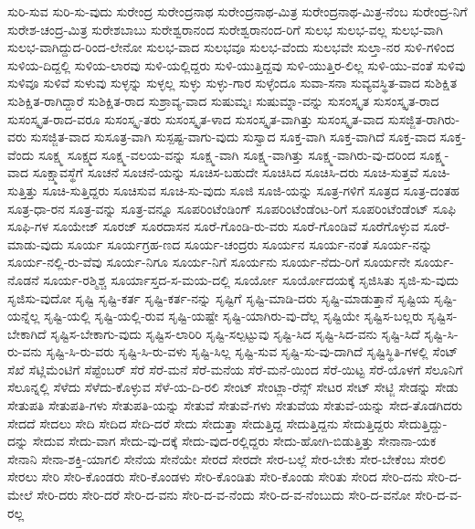 {ಸುರಿ-ಸುವ
ಸುರಿ-ಸು-ವುದು
ಸುರೇಂದ್ರ
ಸುರೇಂದ್ರನಾಥ
ಸುರೇಂದ್ರನಾಥ-ಮಿತ್ರ
ಸುರೇಂದ್ರನಾಥ-ಮಿತ್ರ-ನೆಂಬ
ಸುರೇಂದ್ರ-ನಿಗೆ
ಸುರೇಶ-ಚಂದ್ರ-ಮಿತ್ರ
ಸುರೇಶಬಾಬು
ಸುರೇಶ್ವರಾನಂದ
ಸುರೇಶ್ವರಾನಂದ-ರಿಗೆ
ಸುಲಭ
ಸುಲಭ-ವಲ್ಲ
ಸುಲಭ-ವಾಗಿ
ಸುಲಭ-ವಾಗಿದ್ದುದ-ರಿಂದ-ಲೇನೋ
ಸುಲಭ-ವಾದ
ಸುಲಭವೂ
ಸುಲಭ-ವೆಂದು
ಸುಲಭವೇ
ಸುಲ್ತಾ-ನರ
ಸುಳಿ-ಗಳಿಂದ
ಸುಳಿಯ-ದಿದ್ದಲ್ಲಿ
ಸುಳಿಯ-ಲಾರವು
ಸುಳಿ-ಯಲ್ಲಿದ್ದರು
ಸುಳಿ-ಯುತ್ತಿದ್ದವು
ಸುಳಿ-ಯುತ್ತಿರ-ಲಿಲ್ಲ
ಸುಳಿ-ಯು-ವಂತೆ
ಸುಳಿವು
ಸುಳಿವೂ
ಸುಳಿವೆ
ಸುಳುವು
ಸುಳ್ಳನ್ನು
ಸುಳ್ಳಲ್ಲ
ಸುಳ್ಳು
ಸುಳ್ಳು-ಗಾರ
ಸುಳ್ಳೆಂದೂ
ಸುವಾ-ಸನಾ
ಸುವ್ಯವಸ್ಥಿತ-ವಾದ
ಸುಶಿಕ್ಷಿತ
ಸುಶಿಕ್ಷಿತ-ರಾಗಿದ್ದಾರೆ
ಸುಶಿಕ್ಷಿತ-ರಾದ
ಸುಶ್ರಾವ್ಯ-ವಾದ
ಸುಷುಮ್ನಃ
ಸುಷುಮ್ನಾ-ವನ್ನು
ಸುಸಂಸ್ಕೃತ
ಸುಸಂಸ್ಕೃತ-ರಾದ
ಸುಸಂಸ್ಕೃತ-ರಾದ-ವರೂ
ಸುಸಂಸ್ಕೃ-ತರು
ಸುಸಂಸ್ಕೃತ-ಳಾದ
ಸುಸಂಸ್ಕೃತ-ವಾಗಿತ್ತು
ಸುಸಂಸ್ಕೃತ-ವಾದ
ಸುಸಜ್ಜಿತ-ರಾಗಿರು-ವರು
ಸುಸಜ್ಜಿತ-ವಾದ
ಸುಸೂತ್ರ-ವಾಗಿ
ಸುಸ್ಪಷ್ಟ-ವಾಗು-ವುದು
ಸುಸ್ವಾದ
ಸೂಕ್ತ-ವಾಗಿ
ಸೂಕ್ತ-ವಾಗಿದೆ
ಸೂಕ್ತ-ವಾದ
ಸೂಕ್ತ-ವೆಂದು
ಸೂಕ್ಷ್ಮ
ಸೂಕ್ಷ್ಮದ
ಸೂಕ್ಷ್ಮ-ವಲಯ-ವನ್ನು
ಸೂಕ್ಷ್ಮ-ವಾಗಿ
ಸೂಕ್ಷ್ಮ-ವಾಗಿತ್ತು
ಸೂಕ್ಷ್ಮ-ವಾಗಿರು-ವು-ದರಿಂದ
ಸೂಕ್ಷ್ಮ-ವಾದ
ಸೂಕ್ಷ್ಮಾವಸ್ಥೆಗೆ
ಸೂಚನೆ
ಸೂಚನೆ-ಯನ್ನು
ಸೂಚಿಸ-ಬಹುದೇ
ಸೂಚಿಸಿದ
ಸೂಚಿಸಿ-ದರು
ಸೂಚಿ-ಸುತ್ತವೆ
ಸೂಚಿ-ಸುತ್ತಿತ್ತು
ಸೂಚಿ-ಸುತ್ತಿದ್ದರು
ಸೂಚಿಸುವ
ಸೂಚಿ-ಸು-ವುದು
ಸೂಜಿ
ಸೂಜಿ-ಯನ್ನು
ಸೂತ್ರ-ಗಳಿಗೆ
ಸೂತ್ರದ
ಸೂತ್ರ-ದಂತಹ
ಸೂತ್ರ-ಧಾ-ರನ
ಸೂತ್ರ-ವನ್ನು
ಸೂತ್ರ-ವನ್ನೂ
ಸೂಪರಿಂಟೆಂಡಿಂಗ್
ಸೂಪರಿಂಟೆಂಡೆಂಟ-ರಿಗೆ
ಸೂಪರಿಂಟೆಂಡೆಂಟ್
ಸೂಫಿ
ಸೂಫಿ-ಗಳ
ಸೂಯೇಜ್
ಸೂರಜ್
ಸೂರದಾಸನ
ಸೂರೆ-ಗೊಂಡಿ-ರು-ವರು
ಸೂರೆ-ಗೊಂಡಿವೆ
ಸೂರೆಗೊಳ್ಳುವ
ಸೂರೆ-ಮಾಡು-ವುದು
ಸೂರ್ಯ
ಸೂರ್ಯಗ್ರಹ-ಣದ
ಸೂರ್ಯ-ಚಂದ್ರರು
ಸೂರ್ಯನ
ಸೂರ್ಯ-ನಂತೆ
ಸೂರ್ಯ-ನನ್ನು
ಸೂರ್ಯ-ನಲ್ಲಿ-ರು-ವೆವು
ಸೂರ್ಯ-ನಿಗೂ
ಸೂರ್ಯ-ನಿಗೆ
ಸೂರ್ಯನು
ಸೂರ್ಯ-ನೆದು-ರಿಗೆ
ಸೂರ್ಯನೇ
ಸೂರ್ಯ-ನೊಡನೆ
ಸೂರ್ಯ-ರಶ್ಮಿಶ್ಚ
ಸೂರ್ಯಾಸ್ತದ-ಸ-ಮಯ-ದಲ್ಲಿ
ಸೂರ್ಯೋ
ಸೂರ್ಯೋದಯಕ್ಕೆ
ಸೃಜಿಸಿತು
ಸೃಜಿ-ಸು-ವುದು
ಸೃಜಿಸು-ವುದೋ
ಸೃಷ್ಟಿ
ಸೃಷ್ಟಿ-ಕರ್ತ
ಸೃಷ್ಟಿ-ಕರ್ತ-ನನ್ನು
ಸೃಷ್ಟಿಗೆ
ಸೃಷ್ಟಿ-ಮಾಡಿ-ದರು
ಸೃಷ್ಟಿ-ಮಾಡುತ್ತಾನೆ
ಸೃಷ್ಟಿಯ
ಸೃಷ್ಟಿ-ಯನ್ನೆಲ್ಲ
ಸೃಷ್ಟಿ-ಯಲ್ಲಿ
ಸೃಷ್ಟಿ-ಯಲ್ಲಿ-ರುವ
ಸೃಷ್ಟಿ-ಯಷ್ಟೇ
ಸೃಷ್ಟಿ-ಯಾಗಿರು-ವು-ದೆಲ್ಲ
ಸೃಷ್ಟಿಯೇ
ಸೃಷ್ಟಿಸ-ಬಲ್ಲರು
ಸೃಷ್ಟಿಸ-ಬೇಕಾಗಿದೆ
ಸೃಷ್ಟಿಸ-ಬೇಕಾಗು-ವುದು
ಸೃಷ್ಟಿಸ-ಲಾರಿರಿ
ಸೃಷ್ಟಿ-ಸಲ್ಪಟ್ಟುವು
ಸೃಷ್ಟಿ-ಸಿದ
ಸೃಷ್ಟಿ-ಸಿದ-ವನು
ಸೃಷ್ಟಿ-ಸಿದೆ
ಸೃಷ್ಟಿ-ಸಿ-ರು-ವನು
ಸೃಷ್ಟಿ-ಸಿ-ರು-ವರು
ಸೃಷ್ಟಿ-ಸಿ-ರು-ವಳು
ಸೃಷ್ಟಿ-ಸಿಲ್ಲ
ಸೃಷ್ಟಿ-ಸುವ
ಸೃಷ್ಟಿ-ಸು-ವು-ದಾಗಿದೆ
ಸೃಷ್ಟಿಸ್ಥಿತಿ-ಗಳಲ್ಲಿ
ಸೆಂಟ್
ಸೆಖೆ
ಸೆಟ್ಲಿಮೆಂಟಿಗೆ
ಸೆಪ್ಟೆಂಬರ್
ಸೆರೆ
ಸೆರೆ-ಮನೆ
ಸೆರೆ-ಮನೆಯ
ಸೆರೆ-ಮನೆ-ಯಿಂದ
ಸೆರೆ-ಯಿಟ್ಟ
ಸೆರೆ-ಯೊಳಗೆ
ಸೆಲೂನಿಗೆ
ಸೆಲೂನ್ನಲ್ಲಿ
ಸೆಳೆದು
ಸೆಳೆದು-ಕೊಳ್ಳುವ
ಸೆಳೆ-ಯ-ದಿ-ರಲಿ
ಸೇಂಟ್
ಸೇಂಟ್ಲಾ-ರೆನ್ಸ್
ಸೇಟರ
ಸೇಟ್
ಸೇಟ್ಜಿ
ಸೇಡನ್ನು
ಸೇಡು
ಸೇತುಪತಿ
ಸೇತುಪತಿ-ಗಳು
ಸೇತುಪತಿ-ಯನ್ನು
ಸೇತುವೆ
ಸೇತುವೆ-ಗಳು
ಸೇತುವೆಯ
ಸೇತುವೆ-ಯನ್ನು
ಸೇದ-ತೊಡಗಿದರು
ಸೇದದೆ
ಸೇದಲು
ಸೇದಿ
ಸೇದಿದ
ಸೇದಿ-ದರೆ
ಸೇದು
ಸೇದುತ್ತಾ
ಸೇದುತ್ತಿದ್ದ
ಸೇದುತ್ತಿದ್ದನು
ಸೇದುತ್ತಿದ್ದರು
ಸೇದುತ್ತಿದ್ದು-ದನ್ನು
ಸೇದುವ
ಸೇದು-ವಾಗ
ಸೇದು-ವು-ದಕ್ಕೆ
ಸೇದು-ವುದ-ರಲ್ಲಿದ್ದರು
ಸೇದು-ಹೋಗಿ-ಬಿಡುತ್ತಿತ್ತು
ಸೇನಾನಾ-ಯಕ
ಸೇನಾನಿ
ಸೇನಾ-ಶಕ್ತಿ-ಯಾಗಲಿ
ಸೇನೆಯ
ಸೇನೆಯೇ
ಸೇರದೆ
ಸೇರದೇ
ಸೇರ-ಬಲ್ಲೆ
ಸೇರ-ಬೇಕು
ಸೇರ-ಬೇಕೆಂಬ
ಸೇರಲಿ
ಸೇರಲು
ಸೇರಿ
ಸೇರಿ-ಕೊಂಡರು
ಸೇರಿ-ಕೊಂಡಳು
ಸೇರಿ-ಕೊಂಡಿತು
ಸೇರಿ-ಕೊಂಡು
ಸೇರಿತು
ಸೇರಿದ
ಸೇರಿ-ದನು
ಸೇರಿ-ದ-ಮೇಲೆ
ಸೇರಿ-ದರು
ಸೇರಿ-ದರೆ
ಸೇರಿ-ದ-ವನು
ಸೇರಿ-ದ-ವ-ನೆಂದು
ಸೇರಿ-ದ-ವ-ನೆಂಬುದು
ಸೇರಿ-ದ-ವನೋ
ಸೇರಿ-ದ-ವ-ರಲ್ಲ
}
